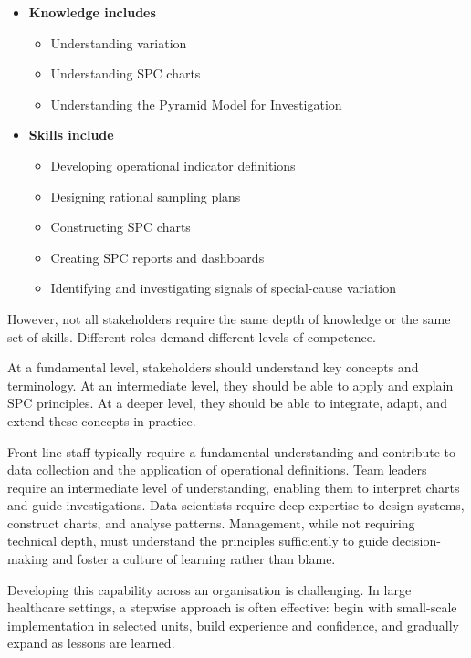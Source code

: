 \documentclass[
]{book}
\providecommand{\tightlist}{%
  \setlength{\itemsep}{0pt}\setlength{\parskip}{0pt}}
\begin{document}
\begin{itemize}
\tightlist
\item
  \textbf{Knowledge includes}

  \begin{itemize}
  \tightlist
  \item
    Understanding variation
  \item
    Understanding SPC charts
  \item
    Understanding the Pyramid Model for Investigation
  \end{itemize}
\item
  \textbf{Skills include}

  \begin{itemize}
  \tightlist
  \item
    Developing operational indicator definitions
  \item
    Designing rational sampling plans
  \item
    Constructing SPC charts
  \item
    Creating SPC reports and dashboards
  \item
    Identifying and investigating signals of special-cause variation
  \end{itemize}
\end{itemize}

However, not all stakeholders require the same depth of knowledge or the
same set of skills. Different roles demand different levels of
competence.

At a fundamental level, stakeholders should understand key concepts and
terminology. At an intermediate level, they should be able to apply and
explain SPC principles. At a deeper level, they should be able to
integrate, adapt, and extend these concepts in practice.

Front-line staff typically require a fundamental understanding and
contribute to data collection and the application of operational
definitions. Team leaders require an intermediate level of
understanding, enabling them to interpret charts and guide
investigations. Data scientists require deep expertise to design
systems, construct charts, and analyse patterns. Management, while not
requiring technical depth, must understand the principles sufficiently
to guide decision-making and foster a culture of learning rather than
blame.

Developing this capability across an organisation is challenging. In
large healthcare settings, a stepwise approach is often effective: begin
with small-scale implementation in selected units, build experience and
confidence, and gradually expand as lessons are learned.
\end{document}
